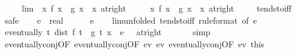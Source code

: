 \begin{isabellebody}
\ \ \ \ \ lim{\isacharcolon}{\kern0pt}\ {\isachardoublequoteopen}{\isacharparenleft}{\kern0pt}{\isacharparenleft}{\kern0pt}{\isasymlambda}\ x{\isachardot}{\kern0pt}\ {\isacharparenleft}{\kern0pt}f{\isacharprime}{\kern0pt}\ x\ {\isacharslash}{\kern0pt}\ g{\isacharprime}{\kern0pt}\ x{\isacharparenright}{\kern0pt}{\isacharparenright}{\kern0pt}\ {\isasymlonglongrightarrow}\ x{\isacharparenright}{\kern0pt}\ {\isacharparenleft}{\kern0pt}at{\isacharunderscore}{\kern0pt}right\ {}{\isacharparenright}{\kern0pt}{\isachardoublequoteclose}\isanewline
\ \ \ {\isachardoublequoteopen}{\isacharparenleft}{\kern0pt}{\isacharparenleft}{\kern0pt}{\isasymlambda}\ x{\isachardot}{\kern0pt}\ f\ x\ {\isacharslash}{\kern0pt}\ g\ x{\isacharparenright}{\kern0pt}\ {\isasymlonglongrightarrow}\ x{\isacharparenright}{\kern0pt}\ {\isacharparenleft}{\kern0pt}at{\isacharunderscore}{\kern0pt}right\ {}{\isacharparenright}{\kern0pt}{\isachardoublequoteclose}\isanewline
%
\isadelimproof
\ \ %
\endisadelimproof
%
\isatagproof
{}\isamarkupfalse%
\ tendsto{\isacharunderscore}{\kern0pt}iff\isanewline
{}\isamarkupfalse%
\ safe\isanewline
\ \ \isamarkupfalse%
\ e\ {\isacharcolon}{\kern0pt}{\isacharcolon}{\kern0pt}\ real\isanewline
\ \ \isamarkupfalse%
\ {\isachardoublequoteopen}{}\ {\isacharless}{\kern0pt}\ e{\isachardoublequoteclose}\isanewline
\ \ \isamarkupfalse%
\ lim{\isacharbrackleft}{\kern0pt}unfolded\ tendsto{\isacharunderscore}{\kern0pt}iff{\isacharcomma}{\kern0pt}\ rule{\isacharunderscore}{\kern0pt}format{\isacharcomma}{\kern0pt}\ of\ {\isachardoublequoteopen}e\ {\isacharslash}{\kern0pt}\ {}{\isachardoublequoteclose}{\isacharbrackright}{\kern0pt}\isanewline
\ \ \isamarkupfalse%
\ {\isachardoublequoteopen}eventually\ {\isacharparenleft}{\kern0pt}{\isasymlambda}t{\isachardot}{\kern0pt}\ dist\ {\isacharparenleft}{\kern0pt}f{\isacharprime}{\kern0pt}\ t\ {\isacharslash}{\kern0pt}\ g{\isacharprime}{\kern0pt}\ t{\isacharparenright}{\kern0pt}\ x\ {\isacharless}{\kern0pt}\ e\ {\isacharslash}{\kern0pt}\ {}{\isacharparenright}{\kern0pt}\ {\isacharparenleft}{\kern0pt}at{\isacharunderscore}{\kern0pt}right\ {}{\isacharparenright}{\kern0pt}{\isachardoublequoteclose}\isanewline
\ \ \ \ \isamarkupfalse%
\ simp\isanewline
\ \ \isamarkupfalse%
\ eventually{\isacharunderscore}{\kern0pt}conj{\isacharbrackleft}{\kern0pt}OF\ eventually{\isacharunderscore}{\kern0pt}conj{\isacharbrackleft}{\kern0pt}OF\ ev{\isacharparenleft}{\kern0pt}{}{\isacharparenright}{\kern0pt}\ ev{\isacharparenleft}{\kern0pt}{}{\isacharparenright}{\kern0pt}{\isacharbrackright}{\kern0pt}\ eventually{\isacharunderscore}{\kern0pt}conj{\isacharbrackleft}{\kern0pt}OF\ ev{\isacharparenleft}{\kern0pt}{}{\isacharparenright}{\kern0pt}\ this{\isacharbrackright}{\kern0pt}{\isacharbrackright}{\kern0pt}\isanewline

\end{isabellebody}
